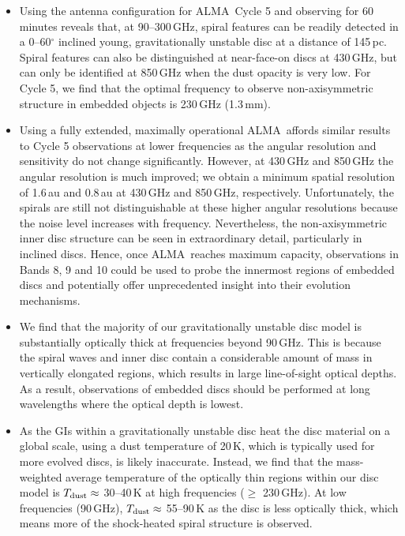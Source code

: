 \documentclass[fleqn,usenatbib]{mnras}
\newcommand{\alma}{ALMA}
\begin{document}
\begin{itemize}[leftmargin=0.0cm, itemindent=1.0cm]

\item Using the antenna configuration for \alma\ Cycle 5 and observing for 60 minutes reveals that, at 90--300\,GHz, spiral features can be readily detected in a 0--60$^\circ$ inclined young, gravitationally unstable disc at a distance of 145\,pc. Spiral features can also be distinguished at near-face-on discs at 430\,GHz, but can only be identified at 850\,GHz when the dust opacity is very low. For Cycle 5, we find that the optimal frequency to observe non-axisymmetric structure in embedded objects is 230\,GHz (1.3\,mm).

\item Using a fully extended, maximally operational \alma\ affords similar results to Cycle 5 observations at lower frequencies as the angular resolution and sensitivity do not change significantly. However, at 430\,GHz and 850\,GHz the angular resolution is much improved; we obtain a minimum spatial resolution of 1.6\,au and 0.8\,au at 430\,GHz and 850\,GHz, respectively. Unfortunately, the spirals are still not distinguishable at these higher angular resolutions because the noise level increases with frequency. Nevertheless, the non-axisymmetric inner disc structure can be seen in extraordinary detail, particularly in inclined discs. Hence, once \alma\ reaches maximum capacity, observations in Bands 8, 9 and 10 could be used to probe the innermost regions of embedded discs and potentially offer unprecedented insight into their evolution mechanisms.

\item We find that the majority of our gravitationally unstable disc model is substantially optically thick at frequencies beyond 90\,GHz. This is because the spiral waves and inner disc contain a considerable amount of mass in vertically elongated regions, which results in large line-of-sight optical depths. As a result, observations of embedded discs should be performed at long wavelengths where the optical depth is lowest.

\item As the GIs within a gravitationally unstable disc heat the disc material on a global scale, using a dust temperature of 20\,K, which is typically used for more evolved discs, is likely inaccurate. Instead, we find that the mass-weighted average temperature of the optically thin regions within our disc model is $T_ {\rm dust} \approx$ 30--40\,K at high frequencies ($\geq$ 230\,GHz). At low frequencies (90\,GHz), $T_ {\rm dust} \approx$ 55--90\,K as the disc is less optically thick, which means more of the shock-heated spiral structure is observed.


\end{itemize}
\end{document}
